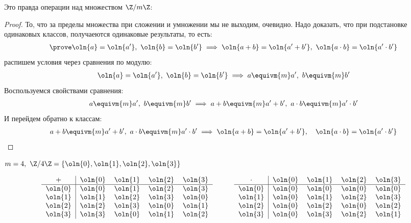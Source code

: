 \begin{theorem-non}
    Это правда операции над множеством $\Z/m\Z$:
\end{theorem-non}
\begin{proof}
    То, что за пределы множества при сложении и умножении мы не выходим, очевидно.
    Надо доказать, что при подстановке одинаковых классов, получаеются одинаковые результаты, то есть:
    \begin{gather*}
        \prove \oln{a} = \oln{a'},~ \oln{b} = \oln{b'} \implies \oln{a + b} = \oln{a' + b'},~\oln{a \cdot b} = \oln{a' \cdot b'}
    \end{gather*}
    распишем условия через сравнения по модулю:
    \begin{gather*}
        \oln{a} = \oln{a'},~\oln{b} = \oln{b'} \implies a \equivm{m} a',~ b \equivm{m} b'
    \end{gather*}
    Воспользуемся свойствами сравнения:
    \begin{gather*}
        a \equivm{m} a',~ b \equivm{m} b' \implies a + b \equivm{m} a' + b',~ a \cdot b \equivm{m} a' \cdot b'
    \end{gather*}
    И перейдем обратно к классам:
    \begin{gather*}
        a + b \equivm{m} a' + b',~ a \cdot b \equivm{m} a' \cdot b' \implies \oln{a + b} = \oln{a' + b'}, \quad \oln{a \cdot b} = \oln{a' \cdot b'}
    \end{gather*}
\end{proof}

\begin{example}
    $m = 4,~ \Z/4\Z = \{\oln{0}, \oln{1}, \oln{2}, \oln{3}\}$
\end{example}

\[
\begin{tabular}{c|cccc}
    $+$ & $\oln{0}$ & $\oln{1}$ & $\oln{2}$ & $\oln{3}$\\
    \hline
    $\oln{0}$ & $\oln{0}$ & $\oln{1}$ & $\oln{2}$ & $\oln{3}$\\
    $\oln{1}$ & $\oln{1}$ & $\oln{2}$ & $\oln{3}$ & $\oln{0}$\\
    $\oln{2}$ & $\oln{2}$ & $\oln{3}$ & $\oln{0}$ & $\oln{1}$\\
    $\oln{3}$ & $\oln{3}$ & $\oln{0}$ & $\oln{1}$ & $\oln{2}$
\end{tabular}
\quad\quad\quad
\begin{tabular}{c|cccc}
    $\cdot$ & $\oln{0}$ & $\oln{1}$ & $\oln{2}$ & $\oln{3}$\\
    \hline
    $\oln{0}$ & $\oln{0}$ & $\oln{0}$ & $\oln{0}$ & $\oln{0}$\\
    $\oln{1}$ & $\oln{0}$ & $\oln{1}$ & $\oln{2}$ & $\oln{3}$\\
    $\oln{2}$ & $\oln{0}$ & $\oln{2}$ & $\oln{0}$ & $\oln{2}$\\
    $\oln{3}$ & $\oln{0}$ & $\oln{3}$ & $\oln{2}$ & $\oln{1}$
\end{tabular}
\]

